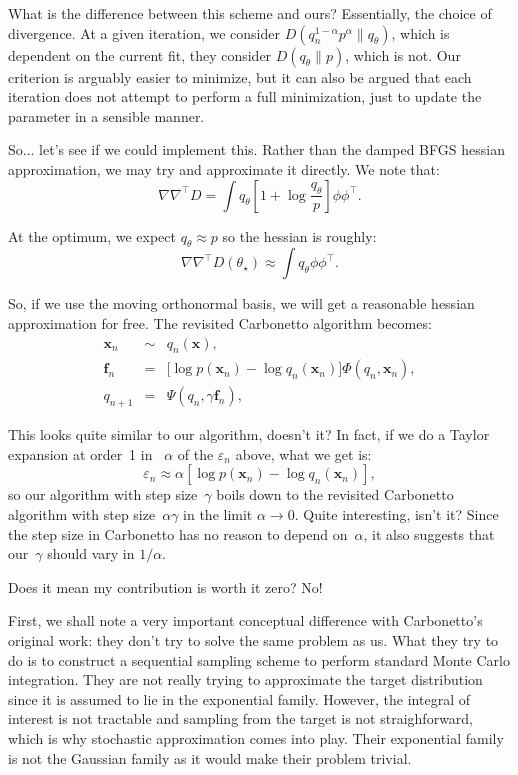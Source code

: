 \documentclass{article}
\def\x{\mathbf{x}}
\def\f{\mathbf{f}}
\begin{document}
What is the difference between this scheme and ours? Essentially, the choice of divergence. At a given iteration, we consider $D(q_n^{1-\alpha}p^\alpha\|q_\theta)$, which is dependent on the current fit, they consider $D(q_\theta\|p)$, which is not. Our criterion is arguably easier to minimize, but it can also be argued that each iteration does not attempt to perform a full minimization, just to update the parameter in a sensible manner. 

So... let's see if we could implement this. Rather than the damped BFGS hessian approximation, we may try and approximate it directly. We note that:
$$
\nabla \nabla^\top D = \int q_\theta \left[1 + \log \frac{q_\theta}{p} \right]\phi\phi^\top.
$$

At the optimum, we expect $q_\theta \approx p$ so the hessian is roughly:
$$
\nabla \nabla^\top D (\theta_\star) \approx \int q_\theta \phi\phi^\top.
$$

So, if we use the moving orthonormal basis, we will get a reasonable hessian approximation for free. The revisited Carbonetto algorithm becomes:
\begin{eqnarray*}
\x_n & \sim & q_n(\x),\\
\f_n & = & \big[\log p(\x_n) - \log q_n(\x_n) \big] \Phi(q_n, \x_n),\\
q_{n+1} & = & \Psi(q_n, \gamma \f_n),
\end{eqnarray*}

This looks quite similar to our algorithm, doesn't it? In fact, if we do a Taylor expansion at order~1 in ~$\alpha$ of the $\varepsilon_n$ above, what we get is:
$$
\varepsilon_n \approx \alpha \left[
\log p(\x_n) - \log q_n(\x_n)
\right],
$$
so our algorithm with step size~$\gamma$ boils down to the revisited Carbonetto algorithm with step size~$\alpha\gamma$ in the limit $\alpha\to 0$. Quite interesting, isn't it? Since the step size in Carbonetto has no reason to depend on~$\alpha$, it also suggests that our~$\gamma$ should vary in $1/\alpha$.

Does it mean my contribution is worth it zero? No!

First, we shall note a very important conceptual difference with Carbonetto's original work: they don't try to solve the same problem as us. What they try to do is to construct a sequential sampling scheme to perform standard Monte Carlo integration. They are not really trying to approximate the target distribution since it is assumed to lie in the exponential family. However, the integral of interest is not tractable and sampling from the target is not straighforward, which is why stochastic approximation comes into play. Their exponential family is not the Gaussian family as it would make their problem trivial.
\end{document}
